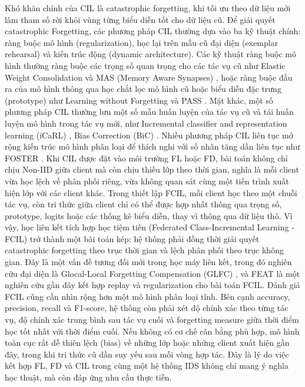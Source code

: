 \bigbreak\noindent
Khó khăn chính của CIL là catastrophic forgetting, khi tối ưu theo dữ liệu mới làm tham số rời khỏi vùng từng biểu diễn tốt cho dữ liệu cũ. Để giải quyết catastrophic Forgetting, các phương pháp CIL thường dựa vào ba kỹ thuật chính: ràng buộc mô hình (regularization), học lại trên mẫu cũ đại diện (exemplar rehearsal) và kiến trúc động (dynamic architecture). Các kỹ thuật ràng buộc mô hình thường ràng buộc các trọng số quan trọng cho các tác vụ cũ như Elastic Weight Consolidation \cite{kirkpatrick2017ewc} và MAS (Memory Aware Synapses) \cite {aljundi2018mas}, hoặc ràng buộc đầu ra của mô hình thông qua học chắt lọc mô hình cũ hoặc biểu diễn đặc trưng (prototype) như Learning without Forgetting \cite{li2017lwf} và PASS \cite{zhu2021pass}. Mặt khác, một số phương pháp CIL thường lưu một số mẫu huấn luyện của tác vụ cũ và tái huấn luyện mô hình trong tác vụ mới, như Incremental classifier and representation learning (iCaRL) \cite{rebuffi2017icarl}, Bias Correction (BiC) \cite{wu2019bic}. Nhiều phương pháp CIL liên tục mở rộng kiến trúc mô hình phân loại để thích nghi với số nhãn tăng dần liên tục như FOSTER \cite{wang2022foster}.
\bigbreak\noindent
Khi CIL được đặt vào môi trường FL hoặc FD, bài toán không chỉ chịu Non-IID giữa client mà còn chịu thiếu lớp theo thời gian, nghĩa là mỗi client vừa học lệch về phân phối riêng, vừa không quan sát cùng một tiến trình xuất hiện lớp với các client khác. Trong thiết lập FCIL, mỗi client học theo một chuỗi tác vụ, còn tri thức giữa client chỉ có thể được hợp nhất thông qua trọng số, prototype, logits hoặc các thống kê biểu diễn, thay vì thông qua dữ liệu thô. Vì vậy, học liên kết tích hợp học tiệm tiến (Federated Class-Incremental Learning - FCIL) trở thành một bài toán kép: hệ thống phải đồng thời giải quyết catastrophic forgetting theo trục thời gian và lệch phân phối theo trục không gian. Đây là một vấn đề tương đối mới trong học máy liên kết, trong đó nghiên cứu đại diện là Glocal-Local Forgetting Compensation (GLFC) \cite{dong2022glfc}, và FEAT \cite{qi2026feat} là một nghiên cứu gần đây kết hợp replay và regularization cho bài toán FCIL.
\bigbreak\noindent
Đánh giá FCIL cũng cần nhìn rộng hơn một mô hình phân loại tĩnh. Bên cạnh accuracy, precision, recall và F1-score, hệ thống còn phải xét độ chính xác theo từng tác vụ, độ chính xác trung bình sau tác vụ cuối và forgetting measure giữa thời điểm học tốt nhất với thời điểm cuối. Nếu không có cơ chế cân bằng phù hợp, mô hình toàn cục rất dễ thiên lệch (bias) về những lớp hoặc những client xuất hiện gần đây, trong khi tri thức cũ dần suy yếu sau mỗi vòng hợp tác. Đây là lý do việc kết hợp FL, FD và CIL trong cùng một hệ thống IDS không chỉ mang ý nghĩa học thuật, mà còn đáp ứng nhu cầu thực tiễn.

